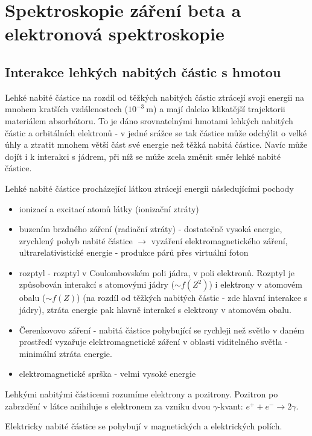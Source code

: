 \documentclass[../../main.tex]{subfiles}
\begin{document}
\chapter{Spektroskopie záření beta a elektronová spektroskopie}

\section{Interakce lehkých nabitých částic s hmotou}

Lehké nabité částice na rozdíl od těžkých nabitých částic ztrácejí svoji energii na mnohem kratších vzdálenostech ($10^{-3} ~\mathrm{m}$) a mají daleko klikatější trajektorii materiálem absorbátoru. To je dáno srovnatelnými hmotami lehkých nabitých částic a orbitálních elektronů - v jedné srážce se tak částice může odchýlit o velké úhly a ztratit mnohem větší část své energie než těžká nabitá částice. Navíc může dojít i k interakci s jádrem, při níž se může zcela změnit směr lehké nabité částice.

Lehké nabité částice procházející látkou ztrácejí energii následujícími pochody
\begin{itemize}
	\item ionizací a excitací atomů látky (ionizační ztráty)
	\item buzením brzdného záření (radiační ztráty) - dostatečně vysoká energie, zrychlený pohyb nabité částice $\rightarrow$ vyzáření elektromagnetického záření, ultrarelativistické energie - produkce párů přes virtuální foton 
	\item rozptyl - rozptyl v Coulombovském poli jádra, v poli elektronů. Rozptyl je způsobován interakcí s atomovými jádry ($\sim f(Z^2)$) i elektrony v atomovém obalu ($\sim f(Z)$) (na rozdíl od těžkých nabitých částic - zde hlavní interakce s jádry), ztráta energie pak hlavně interakcí s elektrony v atomovém obalu.
	\item Čerenkovovo záření - nabitá částice pohybující se rychleji než světlo v daném prostředí vyzařuje elektromagnetické záření v oblasti viditelného světla - minimální ztráta energie.
	\item elektromagnetické sprška - velmi vysoké energie  
\end{itemize}

Lehkými nabitými částicemi rozumíme elektrony a pozitrony. Pozitron po zabrzdění v látce anihiluje s elektronem za vzniku dvou $\gamma$-kvant: $e^+ + e^- \rightarrow 2 \gamma$.

Elektricky nabité částice se pohybují v magnetických a elektrických polích.
\end{document}
